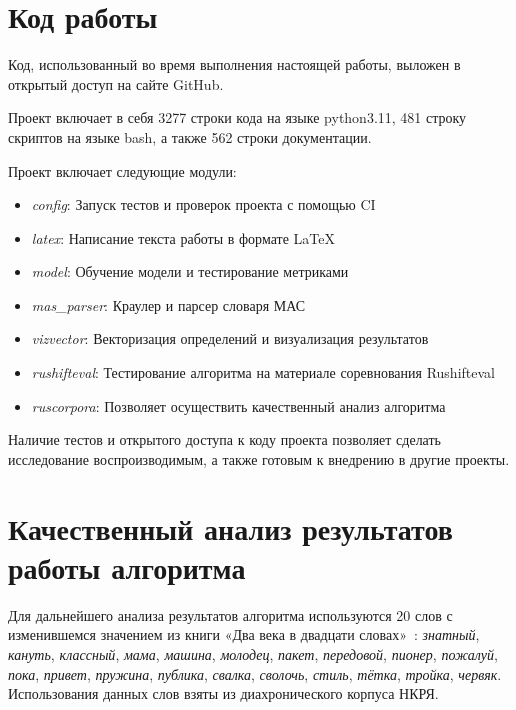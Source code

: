 \documentclass[LI,VKR]{HSEUniversity}
\begin{document}
\section{Код работы}

Код, использованный во время выполнения настоящей работы, выложен в открытый доступ
на сайте GitHub.~

Проект включает в себя 3277 строки кода на языке python3.11, %
481 строку скриптов на языке bash,
а также 562 строки документации. %

Проект включает следующие модули:
\begin{itemize}
    \item \textit{config}: Запуск тестов и проверок проекта с помощью CI
    \item \textit{latex}: Написание текста работы в формате LaTeX
    \item \textit{model}: Обучение модели и тестирование метриками
    \item \textit{mas\_parser}: Краулер и парсер словаря МАС
    \item \textit{vizvector}: Векторизация определений и визуализация результатов
    \item \textit{rushifteval}: Тестирование алгоритма на материале соревнования Rushifteval
    \item \textit{ruscorpora}: Позволяет осуществить качественный анализ алгоритма
\end{itemize}

Наличие тестов и открытого доступа к коду проекта позволяет
сделать исследование воспроизводимым, а также готовым к внедрению в другие проекты.

\section{Качественный анализ результатов работы алгоритма}

Для дальнейшего анализа результатов алгоритма используются 20 слов с изменившемся
значением из книги «Два века в двадцати словах»~\cite{TwoCenturies}:
\textit{знатный}, \textit{кануть}, \textit{классный}, \textit{мама}, \textit{машина}, \textit{молодец},
\textit{пакет}, \textit{передовой}, \textit{пионер}, \textit{пожалуй}, \textit{пока}, \textit{привет},
\textit{пружина}, \textit{публика}, \textit{свалка}, \textit{сволочь},
\textit{стиль}, \textit{тётка}, \textit{тройка}, \textit{червяк}.
Использования данных слов взяты из диахронического корпуса НКРЯ.
\end{document}
